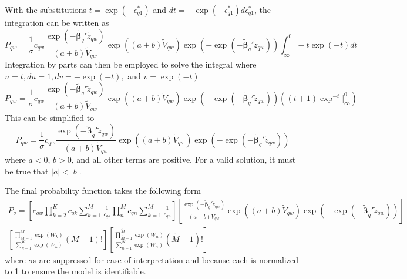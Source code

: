 With the substitutions $t = \exp \left(-\epsilon_{q1}^* \right)$ and $dt = -\exp \left(-\epsilon_{q1}^* \right) d\epsilon_{q1}^*$, the integration can be written as
\begin{equation}\label{eq:prob4}
    P_{qw} = \frac{1}{\sigma} c_{qw} \frac{\exp \left(- \bm{\widetilde{\beta}}_q' \widetilde{z}_{qw} \right) }{\left(a+b\right)\widetilde{V}_{qw}} \exp\left(\left(a+b\right)\widetilde{V}_{qw}\right) \exp\left( - \exp \left(-\bm{\widetilde{\beta}}_q' \widetilde{z}_{qw} \right)\right)
    \int_{\infty}^{0}  - t \exp\left( -t \right) dt
\end{equation}
Integration by parts can then be employed to solve the integral where $u = t, du = 1, dv = -\exp(-t),$ and $v=\exp(-t)$
\begin{equation}\label{eq:prob5}
    P_{qw} = \frac{1}{\sigma} c_{qw} \frac{\exp \left(- \bm{\widetilde{\beta}}_q' \widetilde{z}_{qw} \right) }{\left(a+b\right)\widetilde{V}_{qw}} \exp\left(\left(a+b\right)\widetilde{V}_{qw}\right) \exp\left( - \exp \left(-\bm{\widetilde{\beta}}_q' \widetilde{z}_{qw} \right)\right) \left((t+1)\exp^{-t}\Big|_{\infty}^0 \right)
\end{equation}
This can be simplified to
\begin{equation}\label{eq:prob6}
    P_{qw} = \frac{1}{\sigma} c_{qw} \frac{\exp \left(- \bm{\widetilde{\beta}}_q' \widetilde{z}_{qw} \right) }{\left(a+b\right)\widetilde{V}_{qw}} \exp\left(\left(a+b\right)\widetilde{V}_{qw}\right) \exp\left( - \exp \left(-\bm{\widetilde{\beta}}_q' \widetilde{z}_{qw} \right)\right)
\end{equation}
where $a<0$, $b>0$, and all other terms are positive. For a valid solution, it must be true that $|a|<|b|$.

The final probability function takes the following form
\begin{equation}\label{eq:finprob}
\begin{split}
    P_{q} = \left[c_{qw} \prod_{k=2}^K c_{qk} \sum_{k=1}^M \frac{1}{c_{qk}} \prod_{n}^{\widetilde{M}} c_{qn} \sum_{k=1}^{\widetilde{M}} \frac{1}{c_{qn}} \right]
    \left[\frac{\exp \left(- \bm{\widetilde{\beta}}_q' \widetilde{z}_{qw} \right) }{\left(a+b\right)\widetilde{V}_{qw}} \exp\left(\left(a+b\right)\widetilde{V}_{qw}\right) \exp\left( - \exp \left(-\bm{\widetilde{\beta}}_q' \widetilde{z}_{qw} \right)\right) \right] \\
    \left[ \frac{\prod\limits_{M=1}^M \exp(W_k)}{\sum\limits_{k=1}^K \exp(W_k)}\left(M-1\right)! \right]
    \left[ \frac{\prod\limits_{\widetilde{M}=1}^{\widetilde{M}} \exp(W_n)}{\sum\limits_{n=1}^N \exp(W_n)}\left(\widetilde{M}-1\right)! \right]
\end{split}
\end{equation}
where $\sigma$s are suppressed for ease of interpretation and because each is normalized to 1 to ensure the model is identifiable.

